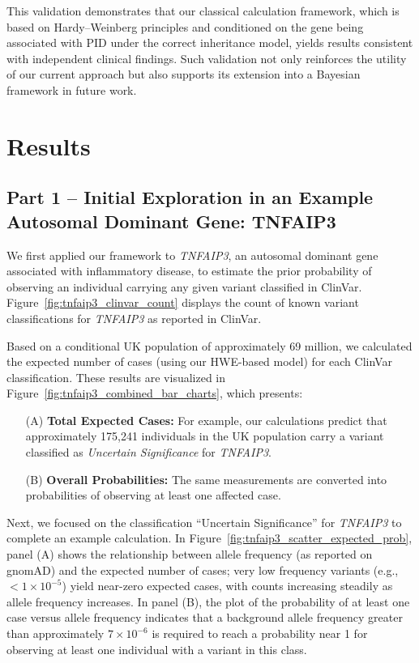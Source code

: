 \documentclass[a4paper,12pt]{article}
\begin{document}
This validation demonstrates that our classical calculation framework, which is based on Hardy–Weinberg principles and conditioned on the gene being associated with PID under the correct inheritance model, yields results consistent with independent clinical findings. Such validation not only reinforces the utility of our current approach but also supports its extension into a Bayesian framework in future work.




















\section{Results}

\subsection{Part 1 -- Initial Exploration in an Example Autosomal Dominant Gene: TNFAIP3}
We first applied our framework to \textit{TNFAIP3}, an autosomal dominant gene associated with inflammatory disease, to estimate the prior probability of observing an individual carrying any given variant classified in ClinVar. Figure~\ref{fig:tnfaip3_clinvar_count} displays the count of known variant classifications for \textit{TNFAIP3} as reported in ClinVar. 

Based on a conditional UK population of approximately 69 million, we calculated the expected number of cases (using our HWE-based model) for each ClinVar classification. These results are visualized in Figure~\ref{fig:tnfaip3_combined_bar_charts}, which presents:
\begin{enumerate}
    \item[(A)] \textbf{Total Expected Cases:} For example, our calculations predict that approximately 175,241 individuals in the UK population carry a variant classified as \textit{Uncertain Significance} for \textit{TNFAIP3}.
    \item[(B)] \textbf{Overall Probabilities:} The same measurements are converted into probabilities of observing at least one affected case.
\end{enumerate}

Next, we focused on the classification “Uncertain Significance” for \textit{TNFAIP3} to complete an example calculation. In Figure~\ref{fig:tnfaip3_scatter_expected_prob}, panel (A) shows the relationship between allele frequency (as reported on gnomAD) and the expected number of cases; very low frequency variants (e.g., \(<1\times10^{-5}\)) yield near-zero expected cases, with counts increasing steadily as allele frequency increases. In panel (B), the plot of the probability of at least one case versus allele frequency indicates that a background allele frequency greater than approximately \(7\times10^{-6}\) is required to reach a probability near 1 for observing at least one individual with a variant in this class.
\end{document}
